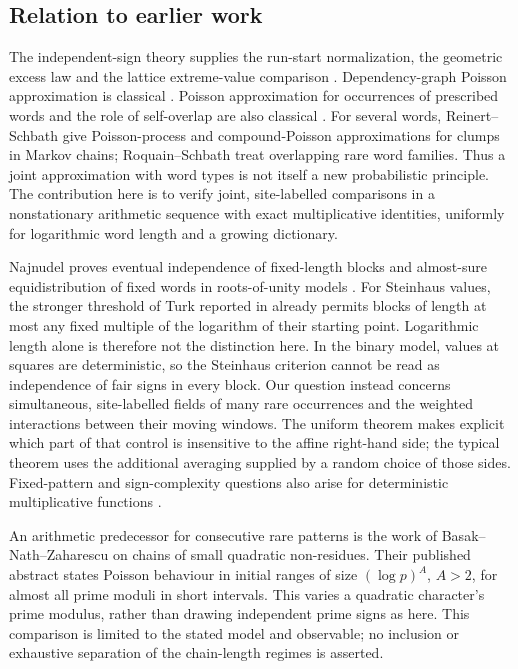 \subsection{Relation to earlier work}
The independent-sign theory supplies the run-start normalization, the
geometric excess law and the lattice extreme-value comparison
\cite{Foldes1979,GordonSchillingWaterman1986,ArratiaGordonWaterman1990}.
Dependency-graph Poisson approximation is classical
\cite{ArratiaGoldsteinGordon1989,ArratiaGoldsteinGordon1990,ChenRollin2013}.
Poisson approximation for occurrences of prescribed words and the role of
self-overlap are also classical \cite{Godbole1991,GodboleSchaffner1993}.
For several words, Reinert--Schbath \cite{ReinertSchbath1998} give
Poisson-process and compound-Poisson approximations for clumps in Markov
chains; Roquain--Schbath \cite{RoquainSchbath2007} treat overlapping rare
word families. Thus a joint approximation with word types is not itself
a new probabilistic principle.
The contribution here is to verify joint, site-labelled comparisons in a
nonstationary arithmetic sequence with exact multiplicative identities,
uniformly for logarithmic word length and a growing dictionary.

Najnudel proves eventual independence of fixed-length blocks and almost-sure
equidistribution of fixed words in roots-of-unity models \cite{Najnudel2020}.
For Steinhaus values, the stronger threshold of Turk reported in
\cite[arXiv version 2, Remark~2.3]{Najnudel2020} already permits blocks of
length at most any fixed multiple of the logarithm of their starting
point. Logarithmic length alone is therefore not the distinction here.
In the binary model, values at squares are deterministic, so the
Steinhaus criterion cannot be read as independence of fair signs in every
block. Our question instead concerns simultaneous, site-labelled fields
of many rare occurrences and the weighted interactions between their
moving windows. The uniform theorem makes explicit which part of that
control is insensitive to the affine right-hand side; the typical
theorem uses the additional averaging supplied by a random choice of
those sides. Fixed-pattern and sign-complexity questions also arise for
deterministic multiplicative functions
\cite{ButtkewitzElsholtz2011,MatomakiRadziwillTao2016,Mangerel2024}.

An arithmetic predecessor for consecutive rare patterns is the work of
Basak--Nath--Zaharescu \cite{BasakNathZaharescu2024} on chains of small
quadratic non-residues. Their published abstract states Poisson behaviour
in initial ranges of size $(\log p)^A$, $A>2$, for almost all prime moduli
in short intervals. This varies a quadratic character's prime modulus,
rather than drawing independent prime signs as here. This comparison is
limited to the stated model and observable; no inclusion or exhaustive
separation of the chain-length regimes is asserted.

